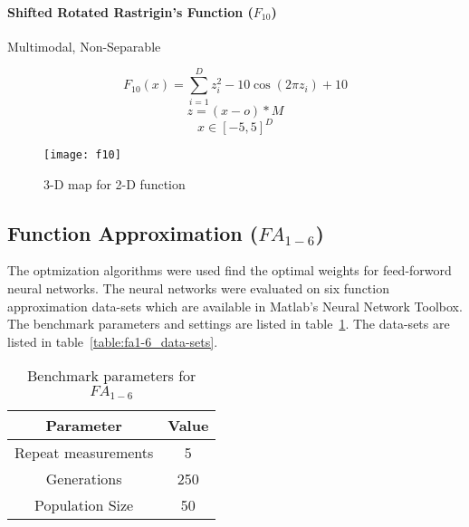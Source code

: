 \paragraph{Shifted Rotated Rastrigin’s Function ($F_{10}$)} Multimodal, Non-Separable

\begin{minipage}{.5\textwidth}
\[
  F_{10}(x)=\sum_{i=1}^{D}{z_i^2 - 10\cos{(2\pi z_i)} + 10}
\]
\[ z=(x-o)*M \]
\[ x \in [-5,5]^D \]
\end{minipage}%
\begin{minipage}{.5\textwidth}
  \begin{figure}[H]
    \centering
    \texttt{[image: f10]}
    \caption{3-D map for 2-D function}
    \label{f10}
  \end{figure}
\end{minipage}




\subsection{Function Approximation ($FA_{1-6}$)}

The optmization algorithms were used find the optimal weights for feed-forword neural networks. The neural networks were evaluated on six function approximation data-sets which are available in Matlab's Neural Network Toolbox. The benchmark parameters and settings are listed in table~\ref{table:fa1-6_params}. The data-sets are listed in table~\ref{table:fa1-6_data-sets}.

\begin{table}[H]
  \centering
  \begin{center}
    \footnotesize
    \begin{tabular}{ | c | c | }
      \hline
      Parameter & Value \\ \hline
      Repeat measurements & 5 \\ \hline
      Generations & 250 \\ \hline
      Population Size & 50 \\ \hline
    \end{tabular}
  \end{center}
  \caption{Benchmark parameters for $FA_{1-6}$}
  \label{table:fa1-6_params}
\end{table}

